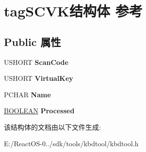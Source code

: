 \hypertarget{structtag_s_c_v_k}{}\section{tag\+S\+C\+V\+K结构体 参考}
\label{structtag_s_c_v_k}
\subsection*{Public 属性}
\begin{DoxyCompactItemize}
\item 
\mbox{\label{structtag_s_c_v_k_a738c9e4040bf884a3aa72c4a5c5dc931}} 
U\+S\+H\+O\+RT {\bfseries Scan\+Code}
\item 
\mbox{\label{structtag_s_c_v_k_a999f2cf8dc1cb2c6ab4b19549ab525e0}} 
U\+S\+H\+O\+RT {\bfseries Virtual\+Key}
\item 
\mbox{\label{structtag_s_c_v_k_af5bb793c5cff044a4f396c5f79110c46}} 
P\+C\+H\+AR {\bfseries Name}
\item 
\mbox{\label{structtag_s_c_v_k_abbe58fdbefe9e767f171a71c8d61e454}} 
\hyperlink{_processor_bind_8h_a112e3146cb38b6ee95e64d85842e380a}{B\+O\+O\+L\+E\+AN} {\bfseries Processed}
\end{DoxyCompactItemize}


该结构体的文档由以下文件生成\+:\begin{DoxyCompactItemize}
\item 
E\+:/\+React\+O\+S-\/0../sdk/tools/kbdtool/kbdtool.\+h\end{DoxyCompactItemize}
